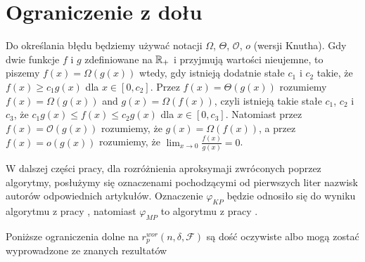 \documentclass[oik, pdftex, robocza, man]{mgrwms}
\begin{document}
    \section{Ograniczenie z dołu}

    Do określania błędu będziemy używać notacji $\varOmega$, $\varTheta$, $\mathcal{O}$, $\textit{o}$ (wersji Knutha). Gdy dwie funkcje $f$ i $g$ zdefiniowane na $\mathbb{R}_{+}$ i przyjmują wartości nieujemne, to piszemy $f(x) = \Omega\left( g(x) \right)$ wtedy, gdy istnieją dodatnie stałe $c_{1}$ i $c_{2}$ takie, że $f(x) \geq c_{1} g(x)$ dla $x \in [0, c_{2}]$. Przez $f(x) = \Theta\left( g(x) \right)$ rozumiemy $f(x) = \Omega\left( g(x) \right)$ and $g(x) = \Omega\left( f(x) \right)$, czyli istnieją takie stałe $c_{1}$, $c_{2}$ i $c_{3}$, że $c_{1} g(x) \leq f(x) \leq c_{2} g(x)$ dla $x \in [0, c_{3}]$. Natomiast przez $f(x) = \mathcal{O}(g(x))$ rozumiemy, że $g(x) = \Omega(f(x))$, a przez $f(x) = \textit{o}(g(x))$ rozumiemy, że $\displaystyle \lim_{x \rightarrow 0} \frac{f(x)}{g(x)} = 0$.

    W dalszej części pracy, dla rozróżnienia aproksymaji zwróconych poprzez algorytmy, posłużymy się oznaczenami pochodzącymi od pierwszych liter nazwisk autorów odpowiednich artykułów. Oznaczenie $\varphi_{KP}$ będzie odnosiło się do wyniku algorytmu z pracy \cite{CoDF}, natomiast $\varphi_{MP}$ to algorytmu z pracy \cite{AoP}.

    Poniższe ograniczenia dolne na $r^{wor}_{p}(n, \delta, \mathcal{F})$ są dość oczywiste albo mogą zostać wyprowadzone ze znanych rezultatów
\end{document}
